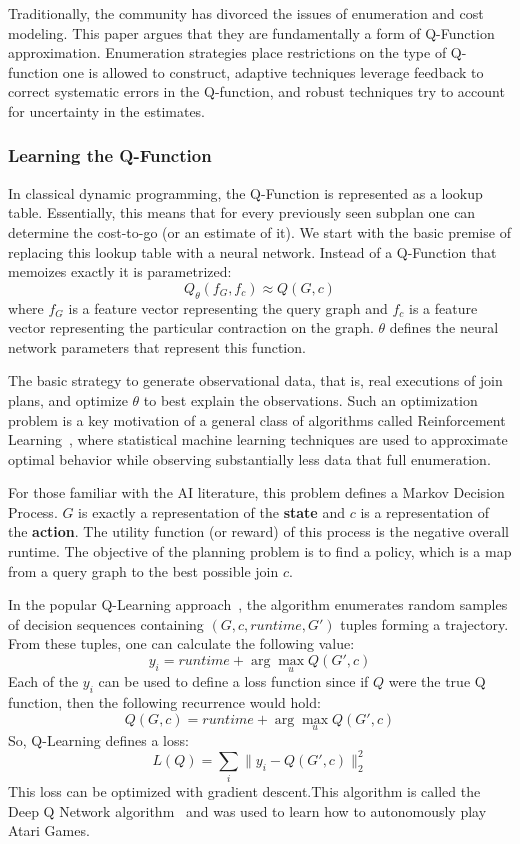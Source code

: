 Traditionally, the community has divorced the issues of enumeration and cost modeling. This paper argues that they are fundamentally a form of Q-Function approximation. Enumeration strategies place restrictions on the type of Q-function one is allowed to construct, adaptive techniques leverage feedback to correct systematic errors in the Q-function, and robust techniques try to account for uncertainty in the estimates.

\subsubsection{Learning the Q-Function}
In classical dynamic programming, the Q-Function is represented as a lookup table. Essentially, this means that for every previously seen subplan one can determine the cost-to-go (or an estimate of it). We start with the basic premise of replacing this lookup table with a neural network. Instead of a Q-Function that memoizes exactly it is parametrized:
\[
Q_\theta(f_G,f_c) \approx Q(G,c)
\]
where $f_G$ is a feature vector representing the query graph and $f_c$ is a feature vector representing the particular contraction on the graph. $\theta$ defines the neural network parameters that represent this function. 

The basic strategy to generate observational data, that is, real executions of join plans, and optimize $\theta$ to best explain the observations. Such an optimization problem is a key motivation of a general class of algorithms called Reinforcement Learning~\cite{sutton1998reinforcement}, where statistical machine learning techniques are used to approximate optimal behavior while observing substantially less data that full enumeration. 

For those familiar with the AI literature, this problem defines a Markov Decision Process. $G$ is exactly a representation of the \textbf{state} and $c$ is a representation of the \textbf{action}.
The utility function (or reward) of this process is the negative overall runtime.
The objective of the planning problem is to find a policy, which is a map from a query graph to the best possible join $c$.

In the popular Q-Learning approach~\cite{sutton1998reinforcement}, the algorithm enumerates random samples of decision sequences containing $(G,c, runtime, G')$ tuples forming a trajectory. From these tuples, one can calculate the following value:
\[
y_i = runtime + \arg \max_{u} Q(G',c)
\]
Each of the $y_i$ can be used to define a loss function since if $Q$ were the true Q function, then the following recurrence would hold:
\[
Q(G,c) = runtime + \arg \max_{u} Q(G',c)
\]
So, Q-Learning defines a loss:
\[
L(Q) = \sum_{i} \|y_i - Q(G',c)\|_2^2
\]
This loss can be optimized with gradient descent.This algorithm is called the Deep Q Network algorithm~\cite{mnih2015human} and was used to learn how to autonomously play Atari Games.

